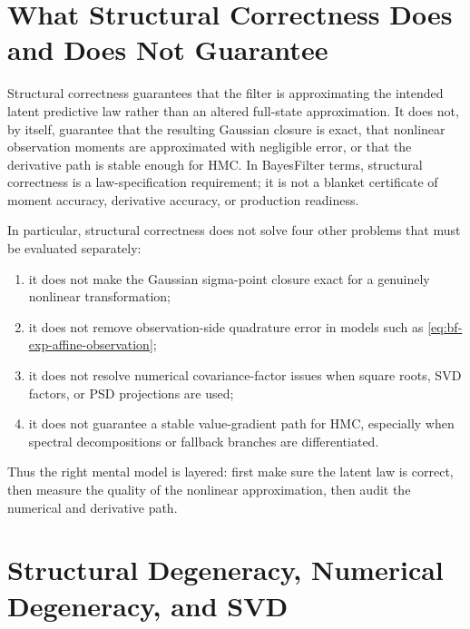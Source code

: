 \section[Structural Correctness Boundary]{What Structural Correctness Does and Does Not Guarantee}
\label{sec:bf-structural-correctness-boundary}

Structural correctness guarantees that the filter is approximating the intended latent predictive law rather than an altered full-state approximation.  It does not, by itself, guarantee that the resulting Gaussian closure is exact, that nonlinear observation moments are approximated with negligible error, or that the derivative path is stable enough for HMC.  In BayesFilter terms, structural correctness is a law-specification requirement; it is not a blanket certificate of moment accuracy, derivative accuracy, or production readiness.

In particular, structural correctness does not solve four other problems that must be evaluated separately:
\begin{enumerate}[label=(\roman*)]
  \item it does not make the Gaussian sigma-point closure exact for a genuinely nonlinear transformation;
  \item it does not remove observation-side quadrature error in models such as
    \eqref{eq:bf-exp-affine-observation};
  \item it does not resolve numerical covariance-factor issues when square roots,
    SVD factors, or PSD projections are used;
  \item it does not guarantee a stable value-gradient path for HMC, especially
    when spectral decompositions or fallback branches are differentiated.
\end{enumerate}
Thus the right mental model is layered: first make sure the latent law is correct, then measure the quality of the nonlinear approximation, then audit the numerical and derivative path.

\section[Degeneracy and SVD]{Structural Degeneracy, Numerical Degeneracy, and SVD}
\label{sec:bf-structural-versus-numerical-degeneracy}

